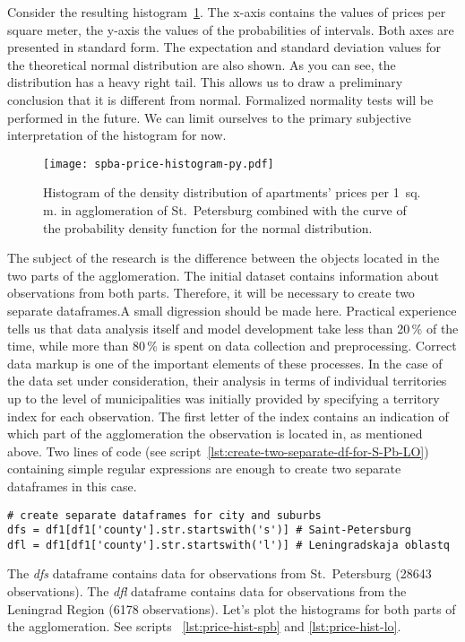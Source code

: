 \documentclass[]{scrreprt}
\begin{document}
Consider the resulting histogram~\ref{fig:spba-prices-hist}. The x-axis contains the values of prices per square meter, the y-axis the values of the probabilities of intervals. Both axes are presented in standard form. The expectation and standard deviation values for the theoretical normal distribution are also shown. As you can see, the distribution has a heavy right tail. This allows us to draw a preliminary conclusion that it is different from normal. Formalized normality tests will be performed in the future. We can limit ourselves to the primary subjective interpretation of the histogram for now.
%
\begin{figure}[htp]
	\centering
	\texttt{[image: spba-price-histogram-py.pdf]}
	\caption{Histogram of the density distribution of apartments' prices per 1~sq.\,m. in agglomeration of  St.~Petersburg combined with the curve of the probability density function for the normal distribution.}
	\label{fig:spba-prices-hist}
\end{figure}
%
The subject of the research is the difference between the objects located in the two parts of the agglomeration. The initial dataset contains information about observations from both parts. Therefore, it will be necessary to create two separate dataframes.A small digression should be made here. Practical experience tells us that data analysis itself and model development take less than 20\,\% of the time, while more than 80\,\% is spent on data collection and preprocessing. Correct data markup is one of the important elements of these processes. In the case of the data set under consideration, their analysis in terms of individual territories up to the level of municipalities was initially provided by specifying a territory index for each observation. The first letter of the index contains an indication of which part of the agglomeration the observation is located in, as mentioned above. Two lines of code (see script~\ref{lst:create-two-separate-df-for-S-Pb-LO}) containing simple regular expressions are enough to create two separate dataframes in this case.
%
\begin{lstlisting}[float, caption = Creating separate dataframes for St.~Petersburg and the Leningrad Region., firstnumber=1, label= lst:create-two-separate-df-for-S-Pb-LO]
# create separate dataframes for city and suburbs
dfs = df1[df1['county'].str.startswith('s')] # Saint-Petersburg
dfl = df1[df1['county'].str.startswith('l')] # Leningradskaja oblastq
\end{lstlisting}
%
The \emph{dfs} dataframe contains data for observations from St.~Petersburg (28643 observations). The \emph{dfl} dataframe contains data for observations from the Leningrad Region (6178 observations). Let's plot the histograms for both parts of the agglomeration. See scripts ~\ref{lst:price-hist-spb} and \ref{lst:price-hist-lo}.
\end{document}
